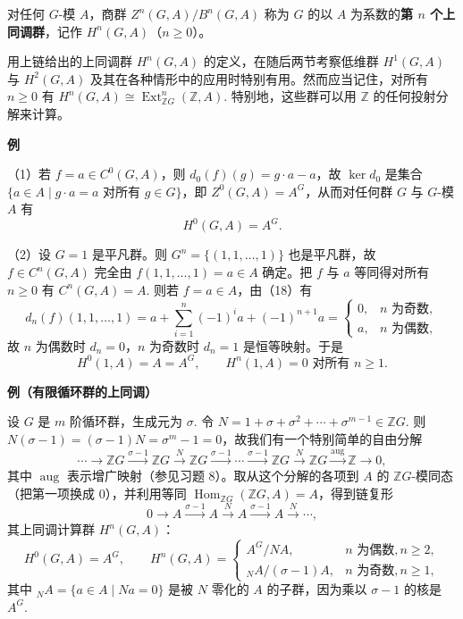 \begin{definition}
对任何 \(G\)-模 \(A\)，商群 \(Z^n(G, A)/B^n(G, A)\) 称为 \(G\) 的以 \(A\) 为系数的\textbf{第 \(n\) 个上同调群}，记作 \(H^n(G, A)\)（\(n \geq 0\)）。
\end{definition}

用上链给出的上同调群 \(H^n(G, A)\) 的定义，在随后两节考察低维群 \(H^1(G, A)\) 与 \(H^2(G, A)\) 及其在各种情形中的应用时特别有用。然而应当记住，对所有 \(n \geq 0\) 有 \(H^n(G, A) \cong \operatorname{Ext}_{\mathbb{Z}G}^n(\mathbb{Z}, A)\). 特别地，这些群可以用 \(\mathbb{Z}\) 的任何投射分解来计算。

\noindent\textbf{例}

（1）若 \(f = a \in C^0(G, A)\)，则 \(d_0(f)(g) = g \cdot a-a\)，故 \(\ker d_0\) 是集合 \(\{a \in A \mid g \cdot a = a \text{ 对所有 } g \in G\}\)，即 \(Z^0(G, A) = A^G\)，从而对任何群 \(G\) 与 \(G\)-模 \(A\) 有
\[
H^0(G, A) = A^G.
\]

（2）设 \(G = 1\) 是平凡群。则 \(G^n = \{(1, 1, \ldots, 1)\}\) 也是平凡群，故 \(f \in C^n(G, A)\) 完全由 \(f(1, 1, \ldots, 1) = a \in A\) 确定。把 \(f\) 与 \(a\) 等同得对所有 \(n \geq 0\) 有 \(C^n(G, A) = A\). 则若 \(f = a \in A\)，由（18）有
\[
d_n(f)(1, 1, \ldots, 1) = a+\sum_{i=1}^{n}(-1)^ia+(-1)^{n+1}a = \begin{cases}0, & n \text{ 为奇数},\\ a, & n \text{ 为偶数},\end{cases}
\]
故 \(n\) 为偶数时 \(d_n = 0\)，\(n\) 为奇数时 \(d_n = 1\) 是恒等映射。于是
\[
H^0(1, A) = A = A^G, \qquad H^n(1, A) = 0 \text{ 对所有 } n \geq 1.
\]

\noindent\textbf{例（有限循环群的上同调）}

设 \(G\) 是 \(m\) 阶循环群，生成元为 \(\sigma\). 令 \(N = 1+\sigma+\sigma^2+\cdots+\sigma^{m-1} \in \mathbb{Z}G\). 则 \(N(\sigma-1) = (\sigma-1)N = \sigma^m-1 = 0\)，故我们有一个特别简单的自由分解
\[
\cdots \to \mathbb{Z}G \xrightarrow{\sigma-1} \mathbb{Z}G \xrightarrow{N} \mathbb{Z}G \xrightarrow{\sigma-1} \cdots \xrightarrow{\sigma-1} \mathbb{Z}G \xrightarrow{N} \mathbb{Z}G \xrightarrow{\operatorname{aug}} \mathbb{Z} \to 0,
\]
其中 \(\operatorname{aug}\) 表示增广映射（参见习题 8）。取从这个分解的各项到 \(A\) 的 \(\mathbb{Z}G\)-模同态（把第一项换成 0），并利用等同 \(\operatorname{Hom}_{\mathbb{Z}G}(\mathbb{Z}G, A) = A\)，得到链复形
\[
0 \to A \xrightarrow{\sigma-1} A \xrightarrow{N} A \xrightarrow{\sigma-1} A \xrightarrow{N} \cdots,
\]
其上同调计算群 \(H^n(G, A)\)：
\[
H^0(G, A) = A^G, \qquad H^n(G, A) = \begin{cases}A^G/NA, & n \text{ 为偶数}, n \geq 2,\\ {}_NA/(\sigma-1)A, & n \text{ 为奇数}, n \geq 1,\end{cases}
\]
其中 \({}_NA = \{a \in A \mid Na = 0\}\) 是被 \(N\) 零化的 \(A\) 的子群，因为乘以 \(\sigma-1\) 的核是 \(A^G\).

